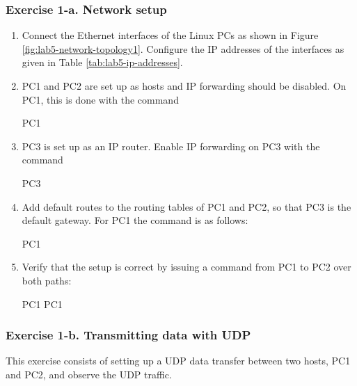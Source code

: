 \subsubsection{Exercise 1-a. Network setup}
\begin{enumerate}
	\item Connect the Ethernet interfaces of the Linux PCs as shown in Figure \ref{fig:lab5-network-topology1}. Configure the IP addresses of the interfaces as given in Table \ref{tab:lab5-ip-addresses}.
	\item PC1 and PC2 are set up as hosts and IP forwarding should be disabled. On PC1, this is done with the command
		\begin{cmdblock}
	PC1%
		\end{cmdblock}
	\item PC3 is set up as an IP router. Enable IP forwarding on PC3 with the command
		\begin{cmdblock}
	PC3%
		\end{cmdblock}
	\item Add default routes to the routing tables of PC1 and PC2, so that PC3 is the default gateway. For PC1 the command is as follows:
		\begin{cmdblock}
	PC1%
		\end{cmdblock}
	\item Verify that the setup is correct by issuing a  command from PC1 to PC2 over both paths:
		\begin{cmdblock}
	PC1%
	PC1%
		\end{cmdblock}
\end{enumerate}

\subsubsection{Exercise 1-b. Transmitting data with UDP}

This exercise consists of setting up a UDP data transfer between two hosts, PC1 and PC2, and observe the UDP traffic.


